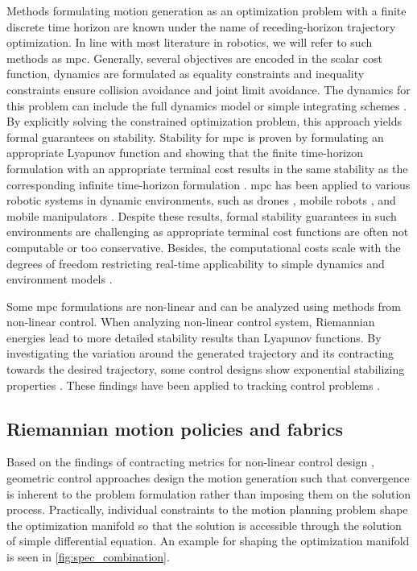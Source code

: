 Methods formulating motion generation as an optimization problem with a finite
discrete time horizon are known under the name of receding-horizon trajectory
optimization. In line with most literature in robotics, we will refer to such
methods as \ac{mpc}.
Generally, several objectives are encoded in the scalar cost function, dynamics
are formulated as equality constraints and inequality constraints ensure
collision avoidance and joint limit avoidance. The dynamics for this problem can
include the full dynamics model or simple integrating schemes \cite{Hewing2020}.
By explicitly solving the constrained optimization problem, this approach yields
formal guarantees on stability. Stability for \ac{mpc} is proven by formulating
an appropriate Lyapunov function and showing that the finite time-horizon
formulation with an appropriate terminal cost results in the same stability as
the corresponding infinite time-horizon formulation
\cite{l1,l4,keerthi1988optimal}. \ac{mpc} has been applied to various robotic
systems in dynamic environments, such as drones \cite{Tordesillas2019}, mobile
robots \cite{Brito2019}, and mobile manipulators
\cite{Avanzini2015,Avanzini2018}. Despite these results, formal stability
guarantees in such environments are challenging as appropriate terminal cost
functions are often not computable or too conservative. Besides, the
computational costs scale with the degrees of freedom restricting real-time
applicability to simple dynamics and environment models \cite{Spahn2021}.

Some \ac{mpc} formulations are non-linear and can be analyzed
using methods from non-linear control. When analyzing non-linear control
system, Riemannian energies lead to more detailed stability results than
Lyapunov functions. By investigating the variation around the generated
trajectory and its contracting towards the desired trajectory, some control
designs show exponential stabilizing properties \cite{l2}. These
findings have been applied to tracking control problems \cite{l3}.

\subsection{Riemannian motion policies and fabrics}%
\label{sub:riemannian_motion_policies_and_fabrics}

Based on the findings of contracting metrics for non-linear
control design \cite{l2,l3}, geometric control approaches design the motion
generation such that convergence is inherent to the problem formulation
rather than imposing them on the solution process. Practically, individual
constraints to the motion planning problem shape the optimization manifold
so that the solution is accessible through the solution of simple differential
equation. An example for shaping the optimization
manifold is seen in \cref{fig:spec_combination}.

